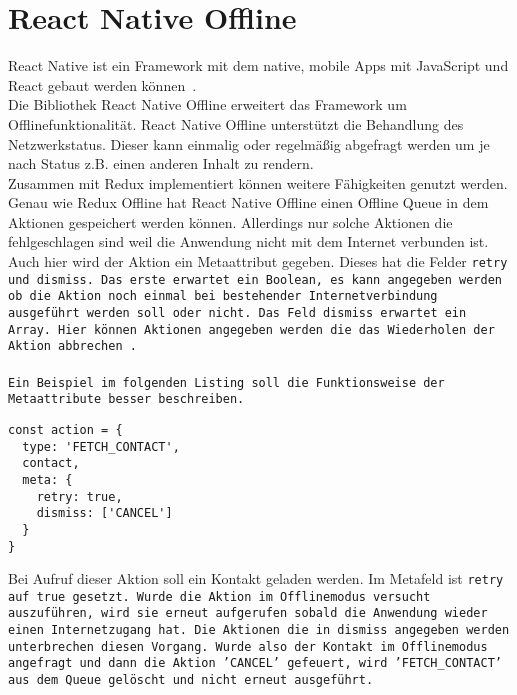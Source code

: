 \section{React Native Offline}
React Native ist ein Framework mit dem native, mobile Apps mit JavaScript und React gebaut werden können~\cite{rn}.\\
Die Bibliothek React Native Offline erweitert das Framework um Offlinefunktionalität.  
React Native Offline unterstützt die Behandlung des Netzwerkstatus. Dieser kann einmalig oder regelmäßig abgefragt  werden um je nach Status z.B. einen anderen Inhalt zu rendern.\\
Zusammen mit Redux implementiert können weitere Fähigkeiten genutzt werden.
Genau wie Redux Offline hat React Native Offline einen Offline \gls{Queue} in dem Aktionen gespeichert werden können. Allerdings nur solche Aktionen die fehlgeschlagen sind weil die Anwendung nicht mit dem Internet verbunden ist.
Auch hier wird der Aktion ein Metaattribut gegeben. Dieses hat die Felder \tt{retry} und \tt{dismiss}.
Das erste erwartet ein Boolean, es kann angegeben werden ob die Aktion noch einmal bei bestehender Internetverbindung ausgeführt werden soll oder nicht.
Das Feld \tt{dismiss} erwartet ein Array. Hier können Aktionen angegeben werden die das Wiederholen der Aktion abbrechen~\cite{rn-offline-gh}.\\\\
Ein Beispiel im folgenden Listing soll die Funktionsweise der Metaattribute besser beschreiben.
\begin{lstlisting}
const action = {
  type: 'FETCH_CONTACT',
  contact,
  meta: {
    retry: true,
    dismiss: ['CANCEL']
  }
}
\end{lstlisting}
Bei Aufruf dieser Aktion soll ein Kontakt geladen werden. Im Metafeld ist \tt{retry} auf \tt{true} gesetzt. Wurde die Aktion im Offlinemodus versucht auszuführen, wird sie erneut aufgerufen sobald die Anwendung wieder einen Internetzugang hat.
Die Aktionen die in \tt{dismiss} angegeben werden unterbrechen diesen Vorgang.
Wurde also der Kontakt im Offlinemodus angefragt und dann die Aktion 'CANCEL' gefeuert, wird 'FETCH\_CONTACT' aus dem Queue gelöscht und nicht erneut ausgeführt.

